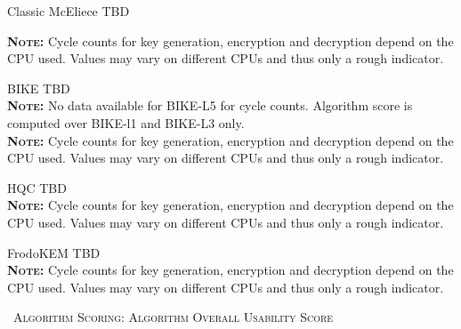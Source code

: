 \documentclass[11pt,english,a4paper, landscape]{scrartcl}
\begin{document}
	\begin{algorithmbox}{Classic McEliece}
		\textcolor{themeblue}{TBD}


		{\tiny  {\bfseries \scshape Note:} Cycle counts for key generation, encryption and decryption depend on the CPU used. Values may vary on different CPUs and thus only a rough indicator.}
	\end{algorithmbox}

	\begin{algorithmbox}{BIKE}
		\textcolor{themeblue}{TBD}\\
		{\tiny  {\bfseries \scshape Note:} No data available for BIKE-L5 for cycle counts. Algorithm score is computed over BIKE-l1 and BIKE-L3 only.}\\
		{\tiny  {\bfseries \scshape Note:} Cycle counts for key generation, encryption and decryption depend on the CPU used. Values may vary on different CPUs and thus only a rough indicator.}

	\end{algorithmbox}

	\begin{algorithmbox}{HQC}
		\textcolor{themeblue}{TBD}\\
		{\tiny  {\bfseries \scshape Note:} Cycle counts for key generation, encryption and decryption depend on the CPU used. Values may vary on different CPUs and thus only a rough indicator.}
	\end{algorithmbox}

	\begin{algorithmbox}{FrodoKEM}
		\textcolor{themeblue}{TBD}\\
		{\tiny  {\bfseries \scshape Note:} Cycle counts for key generation, encryption and decryption depend on the CPU used. Values may vary on different CPUs and thus only a rough indicator.}
	\end{algorithmbox}


	\newpage
	{\large \scshape \faInfo\, Algorithm Scoring: Algorithm Overall Usability Score}\\
\end{document}
